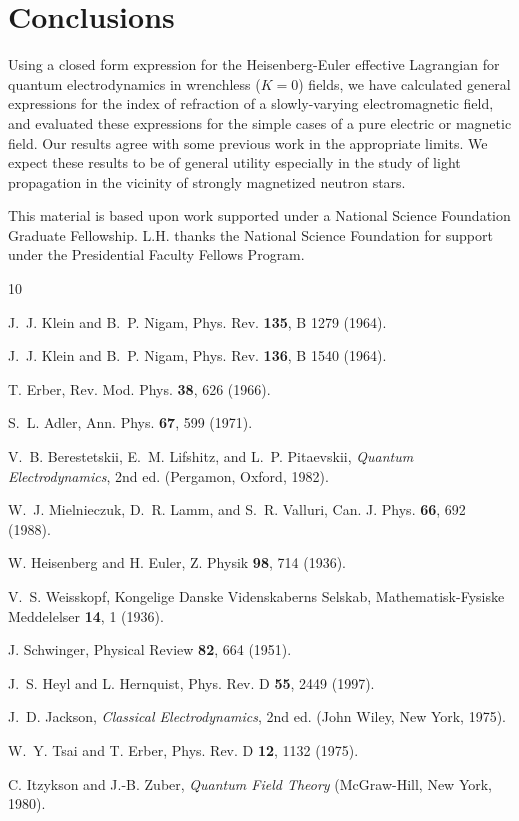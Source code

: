 \section{Conclusions}

Using a closed form expression for the Heisenberg-Euler effective
Lagrangian for quantum electrodynamics in wrenchless ($K=0$) fields,
we have calculated general expressions for the index of refraction of
a slowly-varying electromagnetic field, and evaluated these
expressions for the simple cases of a pure electric or magnetic field.
Our results agree with some previous work \cite{Adle71,Bere82,Miel88,Tsai75}
in the appropriate limits.  We expect these results to be of general
utility especially in the study of light propagation in the vicinity
of strongly magnetized neutron stars.

\acknowledgements

This material is based upon work supported under a National Science
Foundation Graduate Fellowship. L.H. thanks the National Science
Foundation for support under the Presidential Faculty Fellows Program.

\begin{thebibliography}{10}

J.~J. Klein and B.~P. Nigam, Phys. Rev. {\bf 135},  B 1279  (1964).

J.~J. Klein and B.~P. Nigam, Phys. Rev. {\bf 136},  B 1540  (1964).

T. Erber, Rev. Mod. Phys. {\bf 38},  626  (1966).

S.~L. Adler, Ann. Phys. {\bf 67},  599  (1971).

V.~B. Berestetskii, E.~M. Lifshitz, and L.~P. Pitaevskii, {\em Quantum
  Electrodynamics}, 2nd  ed. (Pergamon, Oxford, 1982).

W.~J. Mielnieczuk, D.~R. Lamm, and S.~R. Valluri, Can. J. Phys. {\bf 66},  692
  (1988).

W. Heisenberg and H. Euler, Z. Physik {\bf 98},  714  (1936).

V.~S. Weisskopf, Kongelige Danske Videnskaberns Selskab, Mathematisk-Fysiske
  Meddelelser {\bf 14},  1  (1936).

J. Schwinger, Physical Review {\bf 82},  664  (1951).

J.~S. Heyl and L. Hernquist, Phys. Rev. D {\bf 55}, 2449  (1997).

J.~D. Jackson, {\em Classical Electrodynamics}, 2nd  ed. (John Wiley, New York,
  1975).

W.~Y. Tsai and T. Erber, Phys. Rev. D {\bf 12},  1132  (1975).

C. Itzykson and J.-B. Zuber, {\em Quantum Field Theory} (McGraw-Hill, New York,
  1980).

\end{thebibliography}

